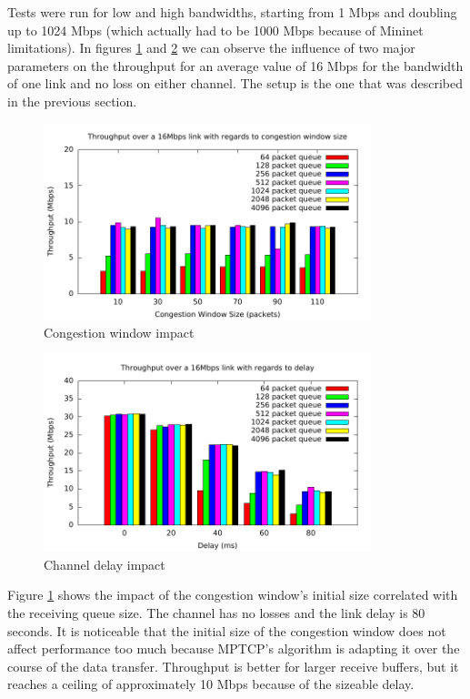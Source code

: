 
Tests were run for low and high bandwidths, starting from 1 Mbps and doubling up to 1024 Mbps (which actually had to be 1000 Mbps because of Mininet limitations). In figures \ref{fig:16mbps-cw} and \ref{fig:16mbps-d}  we can observe the influence of two major parameters on the throughput for an average value of 16 Mbps for the bandwidth of one link and no loss on either channel. The setup is the one that was described in the previous section.

\begin{figure}
  \centering
  \includegraphics[width=0.85\textwidth]{img/throughput-cwnd-16Mbps}
  \caption{Congestion window impact}
  \label{fig:16mbps-cw}
\end{figure}

\begin{figure}
  \centering
  \includegraphics[width=0.85\textwidth]{img/throughput-delay-16Mbps}
  \caption{Channel delay impact}
  \label{fig:16mbps-d}
\end{figure}

Figure \ref{fig:16mbps-cw} shows the impact of the congestion window's initial size correlated with the receiving queue size. The channel has no losses and the link delay is 80 seconds. It is noticeable that the initial size of the congestion window does not affect performance too much because MPTCP's algorithm is adapting it over the course of the data transfer. Throughput is better for larger receive buffers, but it reaches a ceiling of approximately 10 Mbps because of the sizeable delay.

